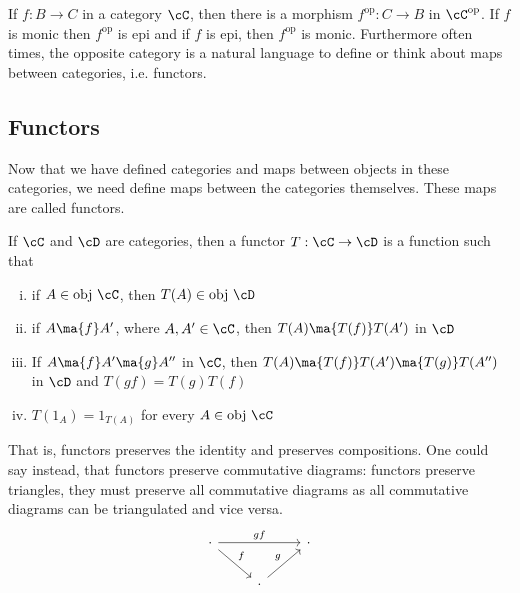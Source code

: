 If $f: B \to C$ in a category $\cC$, then there is a morphism $f^{\text{op}}: C \to B$ in $\cC^{\text{op}}$. If $f$ is monic then $f^{\text{op}}$ is epi and if $f$ is epi, then $f^{\text{op}}$ is monic. Furthermore often times, the opposite category is a natural language to define or think about maps between categories, i.e. functors. 



\subsection{Functors} 



Now that we have defined categories and maps between objects in these categories, we need define maps between the categories themselves. These maps are called functors. 


\begin{dfn}[Functor]
If $\cC$ and $\cD$ are categories, then a functor $T: \cC \rightarrow \cD$ is a function such that
	\begin{enumerate}[(i)]
	\item if $A \in \text{obj } \cC$, then $T(A) \in \text{obj } \cD$
	\item if $A \ma{f} A'$, where $A,A' \in \cC$, then $T(A) \ma{T(f)} T(A')$ in $\cD$
	\item If $A \ma{f} A' \ma{g} A''$ in $\cC$, then $T(A) \ma{T(f)} T(A') \ma{T(g)} T(A'')$ in $\cD$ and $T(gf)=T(g)T(f)$
	\item $T(1_A)=1_{T(A)}$ for every $A \in \text{obj } \cC$
	\end{enumerate}
\end{dfn}


\noindent That is, functors preserves the identity and preserves compositions. One could say instead, that functors preserve commutative diagrams: functors preserve triangles, they must preserve all commutative diagrams as all commutative diagrams can be triangulated and vice versa. 
	\[
	\begin{tikzcd}
	\cdot \arrow{rr}{gf} \arrow{dr}{f} & & \cdot \\
	 & \cdot \arrow{ur}{g}
	\end{tikzcd}
	\]


